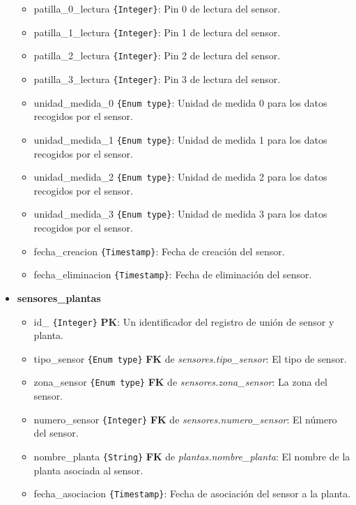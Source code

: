 \begin{itemize}
\begin{itemize}
                \item patilla\_0\_lectura \texttt{\{Integer\}}: Pin 0 de lectura del sensor.
                \item patilla\_1\_lectura \texttt{\{Integer\}}: Pin 1 de lectura del sensor.
                \item patilla\_2\_lectura \texttt{\{Integer\}}: Pin 2 de lectura del sensor.
                \item patilla\_3\_lectura \texttt{\{Integer\}}: Pin 3 de lectura del sensor.
                \item unidad\_medida\_0 \texttt{\{Enum type\}}: Unidad de medida 0 para los datos recogidos por el sensor.
                \item unidad\_medida\_1 \texttt{\{Enum type\}}: Unidad de medida 1 para los datos recogidos por el sensor.
                \item unidad\_medida\_2 \texttt{\{Enum type\}}: Unidad de medida 2 para los datos recogidos por el sensor.
                \item unidad\_medida\_3 \texttt{\{Enum type\}}: Unidad de medida 3 para los datos recogidos por el sensor.
                \item fecha\_creacion \texttt{\{Timestamp\}}: Fecha de creación del sensor.
                \item fecha\_eliminacion \texttt{\{Timestamp\}}: Fecha de eliminación del sensor.
            \end{itemize}
            \item \textbf{sensores\_plantas}
            \begin{itemize}
                \item id\_ \texttt{\{Integer\}} \textbf{PK}: Un identificador del registro de unión de sensor y planta.
                \item tipo\_sensor \texttt{\{Enum type\}} \textbf{FK} de \textit{sensores.tipo\_sensor}: El tipo de sensor.
                \item zona\_sensor \texttt{\{Enum type\}} \textbf{FK} de \textit{sensores.zona\_sensor}: La zona del sensor.
                \item numero\_sensor \texttt{\{Integer\}} \textbf{FK} de \textit{sensores.numero\_sensor}: El número del sensor.
                \item nombre\_planta \texttt{\{String\}} \textbf{FK} de \textit{ plantas.nombre\_planta}: El nombre de la planta asociada al sensor.
                \item fecha\_asociacion \texttt{\{Timestamp\}}: Fecha de asociación del sensor a la planta.

\end{itemize}
\end{itemize}
